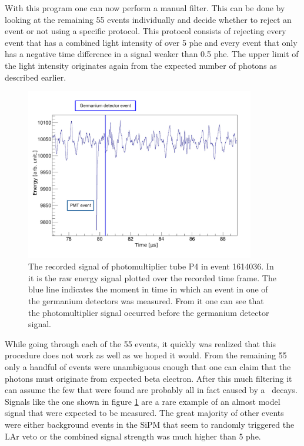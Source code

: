 \documentclass[encoding=utf8,british]{tumphthesis}
\begin{document}
With this program one can now perform a manual filter.
This can be done by looking at the remaining 55 events individually and decide whether to reject an event or not using a specific protocol.
This protocol consists of rejecting every event that has a combined light intensity of over 5 phe and every event that only has a negative time difference in a signal weaker than 0.5 phe.
The upper limit of the light intensity originates again from the expected number of photons as described earlier.
\\

\begin{figure}[t!]
	\centering
	\ifmakefigures%
	\includegraphics[width=100mm]{./Bilder/BeispielSignal.pdf}
	\fi%

	\caption{
    The recorded signal of photomultiplier tube P4 in event 1614036. 
    In it is the raw energy signal plotted over the recorded time frame. 
    The blue line indicates the moment in time in which an event in one of the germanium detectors was measured. 
    From it one can see that the photomultiplier signal occurred before the germanium detector signal.   
    }
    	\label{fig:BeispielSignal}
\end{figure}

While going through each of the 55 events, it quickly was realized that this procedure does not work as well as we hoped it would.
From the remaining 55 only a handful of events were unambiguous enough that one can claim that the photons must originate from expected beta electron.
After this much filtering it can assume the few that were found are probably all in fact caused by a \Kr\ decays.
Signals like the one shown in figure \ref{fig:BeispielSignal} are a rare example of an almost model signal that were expected to be measured.
The great majority of other events were either background events in the SiPM that seem to randomly triggered the LAr veto or the combined signal strength was much higher than 5 phe.\\
\end{document}

